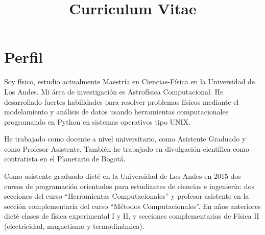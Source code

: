 \documentclass[12pt,letterpaper,sans]{moderncv}
\title{Curriculum Vitae}
\newcommand{\forceindent}{\leavevmode{\parindent=1em\indent}}
\begin{document}
%
%
%
%





\makecvtitle %



\section{Perfil}

Soy físico, estudio actualmente Maestría en Ciencias-Física en la Universidad de Los Andes.
Mi área de investigación es Astrofísica Computacional. He desarrollado fuertes
habilidades para resolver problemas físicos mediante el modelamiento y
análisis de datos usando herramientas computacionales programando en Python en sistemas
operativos tipo UNIX.
\par
\forceindent He trabajado como docente a nivel universitario, como Asistente Graduado
y como Profesor Asistente. También he trabajado en divulgación científica como contratista
en el Planetario de Bogotá.

\forceindent
Como asistente graduado dicté en la Universidad de Los Andes en 2015 dos cursos de
programación orientados para estudiantes de ciencias e ingeniería: dos secciones del curso
``Herramientas Computacionales'' y profesor asistente en la sección complementaria
del curso ``Métodos Computacionales''. En años anteriores dicté clases de física experimental
I y II, y secciones complementarias de Física II (electricidad, magnetismo y termodinámica).
\end{document}
